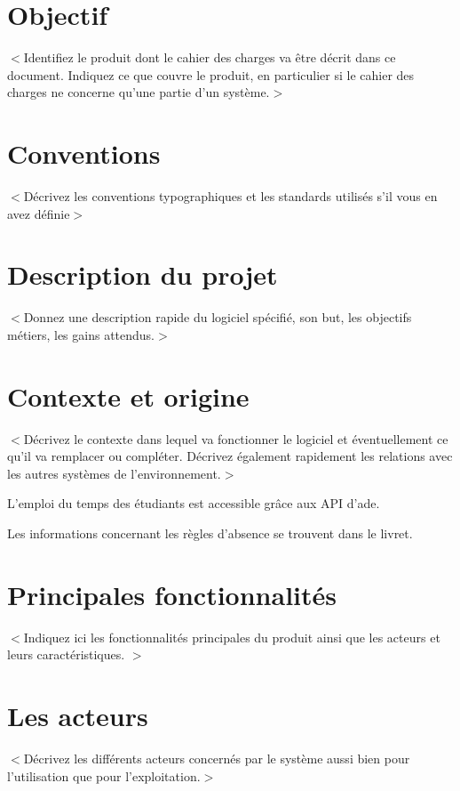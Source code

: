 \documentclass{scrreprt}
\begin{document}
\section{Objectif}
$<$Identifiez le produit dont le cahier des charges va être décrit dans ce document. Indiquez ce que couvre le produit, en particulier si le cahier des charges ne concerne qu'une partie d'un système.$>$

\section{Conventions}
$<$Décrivez les conventions typographiques et les standards utilisés s'il vous en avez définie$>$

\section{Description du projet}
$<$Donnez une description rapide du logiciel spécifié, son but, les objectifs métiers, les gains attendus.$>$


\section{Contexte et origine}
$<$Décrivez le contexte dans lequel va fonctionner le logiciel et éventuellement ce qu'il va remplacer ou compléter. Décrivez également rapidement les relations avec les autres systèmes de l'environnement.$>$

L'emploi du temps des étudiants est accessible grâce aux \acrshort{API} d'\acrshort{ade}.

Les informations concernant les règles d'absence se trouvent dans le \Gls{livret}.

\section{Principales fonctionnalités}
$<$Indiquez ici les fonctionnalités principales du produit ainsi que les acteurs et leurs caractéristiques. $>$

\section{Les acteurs}
$<$Décrivez les différents acteurs concernés par le système aussi bien pour l'utilisation que pour l'exploitation.$>$
\end{document}
